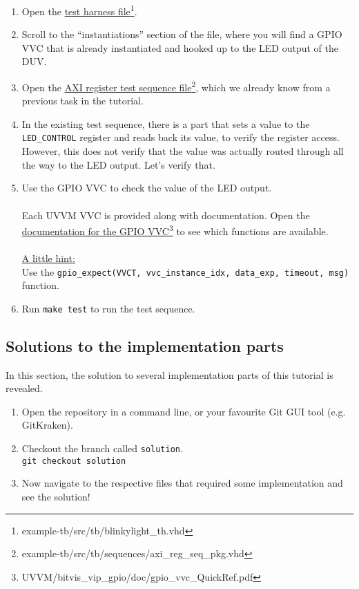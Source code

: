 \begin{enumerate}
      \item Open the \href{../../example-tb/src/tb/blinkylight\_th.vhd} {test harness file}\footnote{example-tb/src/tb/blinkylight\_th.vhd}.
      \item Scroll to the ``instantiations'' section of the file, where you will find a GPIO VVC that is already instantiated and hooked up to the LED output of the DUV.
      \item Open the \href{../../example-tb/src/tb/sequences/axi\_reg\_seq\_pkg.vhd} {AXI register test sequence file}\footnote{example-tb/src/tb/sequences/axi\_reg\_seq\_pkg.vhd}, which we already know from a previous task in the tutorial.
      \item In the existing test sequence, there is a part that sets a value to the \texttt{LED\_CONTROL} register and reads back its value, to verify the register access. However, this does not verify that the value was actually routed through all the way to the LED output. Let's verify that.
      \item Use the GPIO VVC to check the value of the LED output.\\
            \\
            Each UVVM VVC is provided along with documentation. Open the \href{../../UVVM/bitvis\_vip\_gpio/doc/gpio\_vvc\_QuickRef.pdf} {documentation for the GPIO VVC}\footnote{UVVM/bitvis\_vip\_gpio/doc/gpio\_vvc\_QuickRef.pdf} to see which functions are available.\\
            \\
            \underline{A little hint:}\\
            Use the \texttt{gpio\_expect(VVCT, vvc\_instance\_idx, data\_exp, timeout, msg)} function.
      \item Run \texttt{make test} to run the test sequence.

\end{enumerate}

\newpage
\subsection{Solutions to the implementation parts}

In this section, the solution to several implementation parts of this tutorial is revealed.

\begin{enumerate}
      \item Open the repository in a command line, or your favourite Git GUI tool (e.g. GitKraken).
      \item Checkout the branch called \texttt{solution}.\\
            \texttt{git checkout solution}
      \item Now navigate to the respective files that required some implementation and see the solution!
\end{enumerate}
